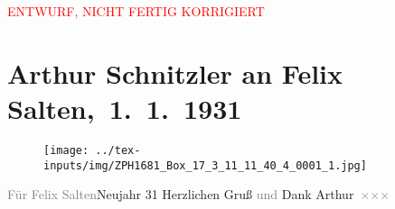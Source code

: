 
\begin{center}
            \textcolor{red}{ENTWURF, NICHT FERTIG KORRIGIERT}
                      \end{center}
            
         
         \renewcommand{\erwaehntePersonen}{Personen: Felix Salten}
         \renewcommand{\erwaehnteOrte}{Orte: Wien}
         \renewcommand{\erwaehnteWerke}{Werke: Arthur Schnitzler}
               \section[ Arthur Schnitzler an Felix Salten, 1. 1. 1931]{ Arthur Schnitzler an Felix Salten, 1. 1. 1931}\nopagebreak{}\rehead{ }\begin{ledgroupsized}[t]{13cm}\normalsize\beginnumbering{} \toendnotes[C]{\smallbreak\pagebreak[2]} 
\toendnotes[C]{\smallbreak}\begin{figure}[H]\centering\texttt{[image: ../tex-inputs/img/ZPH1681\_Box\_17\_3\_11\_11\_40\_4\_0001\_1.jpg]}\end{figure}\pstart
           \noindent{}{\pb}\textcolor{gray}{Für Felix Salten}\hfill Neujahr 31\pend
           \pstart
           Herzlichen Gruß \textcolor{gray}{und}
                  Dank\pend
           \pstart \spacefill\mbox{Arthur \textcolor{gray}{×}\-\textcolor{gray}{×}\-\textcolor{gray}{×}}\pend{}
         
         \endnumbering{}\end{ledgroupsized}\begin{anhang}\end{anhang}\newcommand{\dateiname}{L03485}\newcommand{\titel}{Arthur Schnitzler an Felix Salten, 1. 1. 1931}\newcommand{\editorInnen}{Martin Anton Müller und Laura Untner}
      